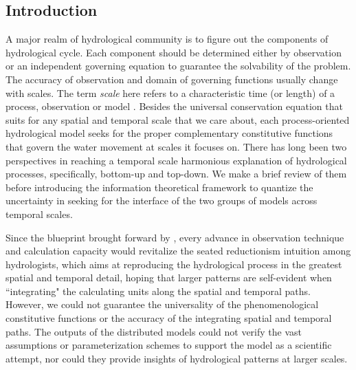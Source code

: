 \documentclass[draft,wrr]{AGUTeX}
\begin{document}

\begin{article}

\section{Introduction}
A major realm of hydrological community is to figure out the components of hydrological cycle. Each component should be determined either by observation or an independent governing equation to guarantee the solvability of the problem. The accuracy of observation  and domain of governing functions usually change with scales. The term \emph{scale} here refers to a characteristic time (or length) of a process, observation or model \citep{bloschl1995scale}.  Besides the  universal conservation equation that suits for any spatial and temporal scale that we care about, each process-oriented hydrological model seeks for the proper complementary constitutive functions that govern the water movement at scales it focuses on. There has long been two perspectives in reaching a temporal scale harmonious explanation of hydrological processes, specifically, bottom-up and top-down. We make a brief review of them before introducing the information theoretical framework to quantize the uncertainty in seeking for the interface of the two groups of models across temporal scales. 

Since the blueprint brought forward by \citet{freeze1969blueprint}, 
 every advance in observation technique and calculation capacity would revitalize the seated reductionism intuition among hydrologists, which aims at reproducing the hydrological process in the greatest spatial and temporal detail, hoping that larger patterns are self-evident when ``integrating" the calculating units along the spatial and temporal paths. However, we could not guarantee the universality of the phenomenological constitutive functions or the accuracy of the integrating spatial and temporal paths. The outputs of the distributed models could not verify the vast assumptions or parameterization schemes to support the model as a scientific attempt, nor could they provide insights of hydrological patterns at larger scales.  



\end{article}
\end{document}
